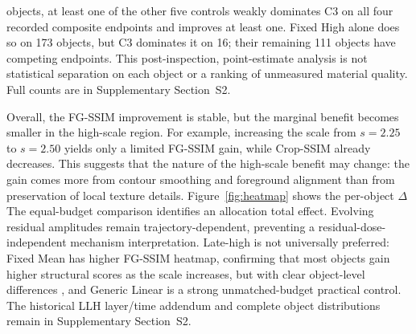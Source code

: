 \documentclass[times,twocolumn,final]{elsarticle}
\providecommand{\DIFadd}[1]{{\protect\color{blue} \sf #1}} %
\providecommand{\DIFdel}[1]{{\protect\color{red} \scriptsize #1}} %
\providecommand{\DIFaddbegin}{} %
\providecommand{\DIFaddend}{} %
\providecommand{\DIFdelbegin}{} %
\providecommand{\DIFdelend}{} %
\begin{document}
\DIFdelend \DIFaddbegin \DIFadd{300 objects, at least one of the other five controls weakly dominates C3 on all four recorded composite endpoints and improves at least one. Fixed High alone does so on 173 objects, but C3 dominates it on 16; their remaining 111 objects have competing endpoints. This post-inspection, point-estimate analysis is not statistical separation on each object or a ranking of unmeasured material quality. Full counts are in Supplementary Section~S2.
}\DIFaddend 

\DIFdelbegin \DIFdel{Overall, the FG-SSIM improvement is stable, but the marginal benefit becomes smaller in the high-scale region. For example, increasing the scale from $s = 2.25$ to $s = 2.50$ yields only a limited FG-SSIM gain, while Crop-SSIM already decreases. This suggests that the nature of the high-scale benefit may change: the gain comes more from contour smoothing and foreground alignment than from preservation of local texture details. Figure~\ref{fig:heatmap} shows the per-object $\Delta$}\DIFdelend \DIFaddbegin \DIFadd{The equal-budget comparison identifies an allocation total effect. Evolving residual amplitudes remain trajectory-dependent, preventing a residual-dose-independent mechanism interpretation. Late-high is not universally preferred: Fixed Mean has higher }\DIFaddend FG-SSIM\DIFdelbegin \DIFdel{heatmap, confirming that most objects gain higher structural scores as the scale increases, but with clear object-level differences}\DIFdelend \DIFaddbegin \DIFadd{, and Generic Linear is a strong unmatched-budget practical control. The historical LLH layer/time addendum and complete object distributions remain in Supplementary Section~S2}\DIFaddend .
\end{document}
